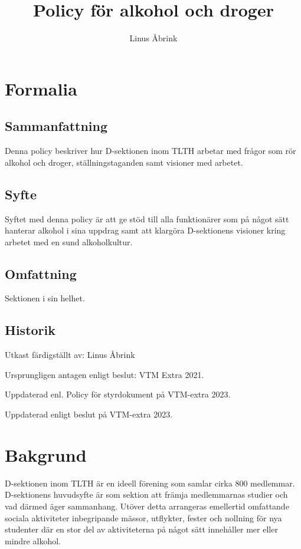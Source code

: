 \documentclass[]{dsekprotokoll}
\title{Policy för alkohol och droger}
\author{Linus Åbrink}
\begin{document}
\maketitle

\section{Formalia}

\subsection{Sammanfattning}
Denna policy beskriver hur D-sektionen inom TLTH arbetar med frågor som rör alkohol och droger, ställningstaganden samt visioner med arbetet.

\subsection{Syfte}
Syftet med denna policy är att ge stöd till alla funktionärer som på något sätt hanterar alkohol
i sina uppdrag samt att klargöra D-sektionens visioner kring arbetet med en sund alkoholkultur.

\subsection{Omfattning}
Sektionen i sin helhet.

\subsection{Historik}
Utkast färdigställt av: Linus Åbrink

Ursprungligen antagen enligt beslut: VTM Extra 2021.

Uppdaterad enl. Policy för styrdokument på VTM-extra 2023.

Uppdaterad enligt beslut på VTM-extra 2023.

\section{Bakgrund}
D-sektionen inom TLTH är en ideell förening som samlar cirka 800 medlemmar. D-sektionens huvudsyfte är som sektion att främja medlemmarnas studier och vad därmed äger sammanhang. Utöver detta arrangeras emellertid omfattande sociala aktiviteter inbegripande mässor, utflykter, fester och nollning för nya studenter där en stor del av aktiviteterna på något sätt innehåller mer eller mindre alkohol.
\end{document}
